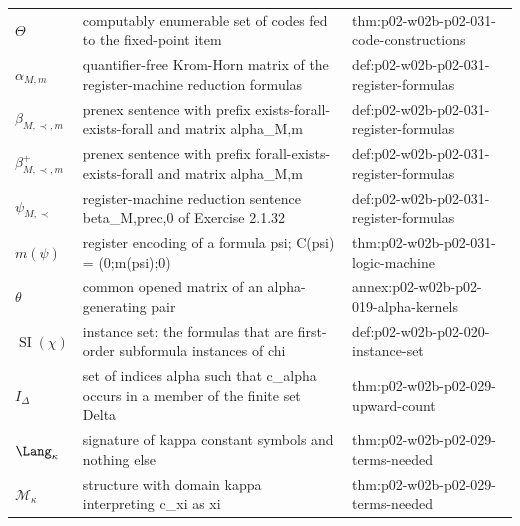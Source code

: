 \begin{longtable}{@{}p{}p{}p{}@{}}
\(\Theta\) & computably enumerable set of codes fed to the fixed-point item & thm:\allowbreak{}p02-\allowbreak{}w02b-\allowbreak{}p02-\allowbreak{}031-\allowbreak{}code-\allowbreak{}constructions \\
\(\alpha_{M,m}\) & quantifier-free Krom-Horn matrix of the register-machine reduction formulas & def:\allowbreak{}p02-\allowbreak{}w02b-\allowbreak{}p02-\allowbreak{}031-\allowbreak{}register-\allowbreak{}formulas \\
\(\beta_{M,\prec,m}\) & prenex sentence with prefix exists-forall-exists-forall and matrix alpha\_{M,m} & def:\allowbreak{}p02-\allowbreak{}w02b-\allowbreak{}p02-\allowbreak{}031-\allowbreak{}register-\allowbreak{}formulas \\
\(\beta^{+}_{M,\prec,m}\) & prenex sentence with prefix forall-exists-exists-forall and matrix alpha\_{M,m} & def:\allowbreak{}p02-\allowbreak{}w02b-\allowbreak{}p02-\allowbreak{}031-\allowbreak{}register-\allowbreak{}formulas \\
\(\psi_{M,\prec}\) & register-machine reduction sentence beta\_{M,prec,0} of Exercise 2.1.32 & def:\allowbreak{}p02-\allowbreak{}w02b-\allowbreak{}p02-\allowbreak{}031-\allowbreak{}register-\allowbreak{}formulas \\
\(m(\psi)\) & register encoding of a formula psi; C(psi) = (0;m(psi);0) & thm:\allowbreak{}p02-\allowbreak{}w02b-\allowbreak{}p02-\allowbreak{}031-\allowbreak{}logic-\allowbreak{}machine \\
\(\theta\) & common opened matrix of an alpha-generating pair & annex:\allowbreak{}p02-\allowbreak{}w02b-\allowbreak{}p02-\allowbreak{}019-\allowbreak{}alpha-\allowbreak{}kernels \\
\(\operatorname{SI}(\chi)\) & instance set: the formulas that are first-order subformula instances of chi & def:\allowbreak{}p02-\allowbreak{}w02b-\allowbreak{}p02-\allowbreak{}020-\allowbreak{}instance-\allowbreak{}set \\
\(I_\Delta\) & set of indices alpha such that c\_alpha occurs in a member of the finite set Delta & thm:\allowbreak{}p02-\allowbreak{}w02b-\allowbreak{}p02-\allowbreak{}029-\allowbreak{}upward-\allowbreak{}count \\
\(\Lang_\kappa\) & signature of kappa constant symbols and nothing else & thm:\allowbreak{}p02-\allowbreak{}w02b-\allowbreak{}p02-\allowbreak{}029-\allowbreak{}terms-\allowbreak{}needed \\
\(\mathcal M_\kappa\) & structure with domain kappa interpreting c\_xi as xi & thm:\allowbreak{}p02-\allowbreak{}w02b-\allowbreak{}p02-\allowbreak{}029-\allowbreak{}terms-\allowbreak{}needed \\

\end{longtable}
